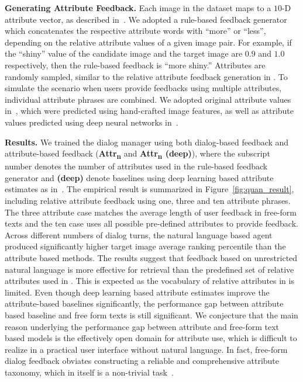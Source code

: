 {\noindent \bf Generating Attribute Feedback.} 
Each image in the 
dataset
maps to a $10$-D attribute vector, as described in~\cite{kovashka2012}.
We adopted a rule-based feedback generator which concatenates the 
respective attribute words with ``more'' or ``less'', depending on the relative attribute
values of a given image pair. For example, 
if the ``shiny'' value of the candidate image and the target image
are $0.9$ and $1.0$ respectively, then the rule-based feedback is 
``more shiny.''  Attributes are randomly sampled, similar to the relative attribute feedback generation in \cite{kovashka2012}. To simulate the scenario when users 
provide feedbacks using multiple attributes, individual attribute phrases are combined.  
We adopted original attribute values in~\cite{kovashka2012}, which
were predicted using hand-crafted image features, as well as attribute values predicted
using deep neural networks in~\cite{7494596}. 

{\noindent \bf Results.} 
We trained the dialog manager using both dialog-based feedback and attribute-based 
feedback (\textbf{Attr\textsubscript{n}} and \textbf{Attr\textsubscript{n} (deep)}), where the subscript number denotes
the number of attributes used in the rule-based feedback generator and \textbf{(deep)} denote baselines using deep learning based attribute estimates as in~\cite{7494596}. The empirical result
is summarized in Figure~\ref{fig:quan_result}, including relative attribute feedback using
one, three and ten attribute phrases. The three attribute case matches the average length of user feedback in free-form texts and the ten case uses all possible pre-defined attributes to provide feedback.   
Across different numbers of dialog turns, the natural language 
based agent produced significantly higher target image average 
ranking percentile than the attribute based
methods. 
The results suggest that feedback based on unrestricted natural language 
is more effective for retrieval than the predefined set of relative attributes used in \cite{kovashka2012}. This is expected as the vocabulary of relative attributes in \cite{kovashka2012} is limited.
Even though deep learning based attribute estimates improve the attribute-based baselines significantly, the performance gap between attribute based baseline and free form texts is still significant. We conjecture that the main reason underlying the  performance gap between attribute and free-form text based models is the effectively open domain for
attribute use, which is difficult to realize in a practical user interface without natural language. In fact, free-form dialog feedback obviates
constructing a reliable and comprehensive attribute taxonomy,
which in itself is a non-trivial task~\cite{maji2012}. 


